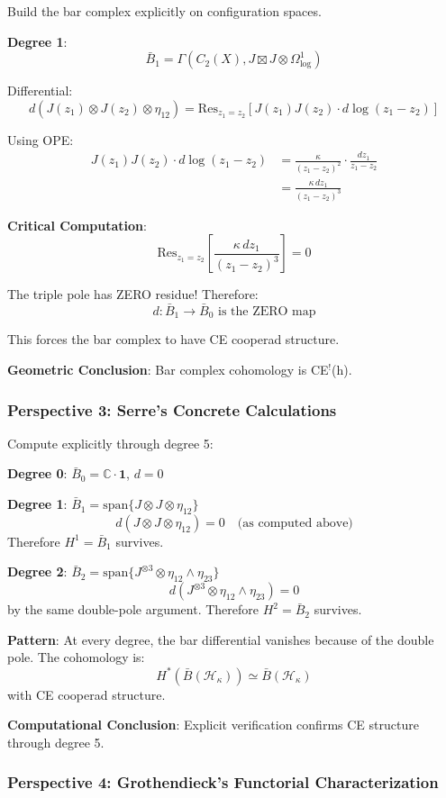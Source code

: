 \begin{example}
Build the bar complex explicitly on configuration spaces.

\textbf{Degree 1}: 
$$\bar{B}_1 = \Gamma(C_2(X), J \boxtimes J \otimes \Omega^1_{\log})$$

Differential:
$$d(J(z_1) \otimes J(z_2) \otimes \eta_{12}) = \text{Res}_{z_1=z_2}[J(z_1)J(z_2) \cdot d\log(z_1-z_2)]$$

Using OPE:
\begin{align}
J(z_1)J(z_2) \cdot d\log(z_1-z_2) &= \frac{\kappa}{(z_1-z_2)^2} \cdot \frac{dz_1}{z_1-z_2} \\
&= \frac{\kappa \, dz_1}{(z_1-z_2)^3}
\end{align}

\textbf{Critical Computation}:
$$\text{Res}_{z_1=z_2}\left[\frac{\kappa \, dz_1}{(z_1-z_2)^3}\right] = 0$$

The triple pole has ZERO residue! Therefore:
$$d: \bar{B}_1 \to \bar{B}_0 \text{ is the ZERO map}$$

This forces the bar complex to have CE cooperad structure.

\textbf{Geometric Conclusion}: Bar complex cohomology is CE$^!$(h).

\subsubsection{Perspective 3: Serre's Concrete Calculations}

Compute explicitly through degree 5:

\textbf{Degree 0}: $\bar{B}_0 = \mathbb{C} \cdot \mathbf{1}$, $d = 0$

\textbf{Degree 1}: $\bar{B}_1 = \text{span}\{J \otimes J \otimes \eta_{12}\}$
$$d(J \otimes J \otimes \eta_{12}) = 0 \quad \text{(as computed above)}$$
Therefore $H^1 = \bar{B}_1$ survives.

\textbf{Degree 2}: $\bar{B}_2 = \text{span}\{J^{\otimes 3} \otimes \eta_{12} \wedge \eta_{23}\}$
$$d(J^{\otimes 3} \otimes \eta_{12} \wedge \eta_{23}) = 0$$
by the same double-pole argument. Therefore $H^2 = \bar{B}_2$ survives.

\textbf{Pattern}: At every degree, the bar differential vanishes because of the double pole.
The cohomology is:
$$H^*(\bar{B}(\mathcal{H}_\kappa)) \simeq \bar{B}(\mathcal{H}_\kappa)$$
with CE cooperad structure.

\textbf{Computational Conclusion}: Explicit verification confirms CE structure through degree 5.

\subsubsection{Perspective 4: Grothendieck's Functorial Characterization}


\end{example}
